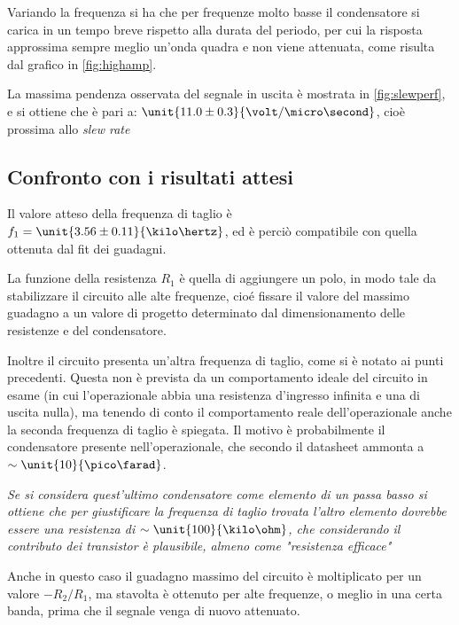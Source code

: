 \documentclass[10pt,a4paper]{article}
\begin{document}
Variando la frequenza si ha che per frequenze molto basse il condensatore si carica in un tempo breve rispetto alla durata del periodo, per cui la risposta approssima sempre meglio un'onda quadra e non viene attenuata, come risulta dal grafico in \figurename{\ref{fig:highamp}}.

La massima pendenza osservata del segnale in uscita è mostrata in \figurename{\ref{fig:slewperf}}, e si ottiene che è pari a: $\unit{11.0 \pm 0.3}{\volt/\micro\second}$, cioè prossima allo \emph{slew rate}


\subsection{Confronto con i risultati attesi}

Il valore atteso della frequenza di taglio è $f_1 = \unit{3.56 \pm 0.11}{\kilo\hertz}$, ed è perciò compatibile con quella ottenuta dal fit dei guadagni.


La funzione della resistenza $R_1$ è quella di aggiungere un polo, in modo tale da stabilizzare il circuito alle alte frequenze, cioé fissare il valore del massimo guadagno a un valore di progetto determinato dal dimensionamento delle resistenze e del condensatore.

Inoltre il circuito presenta un'altra frequenza di taglio, come si è notato ai punti precedenti. Questa non è prevista da un comportamento ideale del circuito in esame (in cui l'operazionale abbia una resistenza d'ingresso infinita e una di uscita nulla), ma tenendo di conto il comportamento reale dell'operazionale anche la seconda frequenza di taglio è spiegata. Il motivo è probabilmente il condensatore presente nell'operazionale, che secondo il datasheet ammonta a $\sim \unit{10}{\pico\farad}$.

\emph{Se si considera quest'ultimo condensatore come elemento di un passa basso si ottiene che per giustificare la frequenza di taglio trovata l'altro elemento dovrebbe essere una resistenza di $\sim \unit{100}{\kilo\ohm}$, che considerando il contributo dei transistor è plausibile, almeno come "resistenza efficace"}

Anche in questo caso il guadagno massimo del circuito è moltiplicato per un valore $-R_2/R_1$, ma stavolta è ottenuto per alte frequenze, o meglio in una certa banda, prima che il segnale venga di nuovo attenuato.
\end{document}
